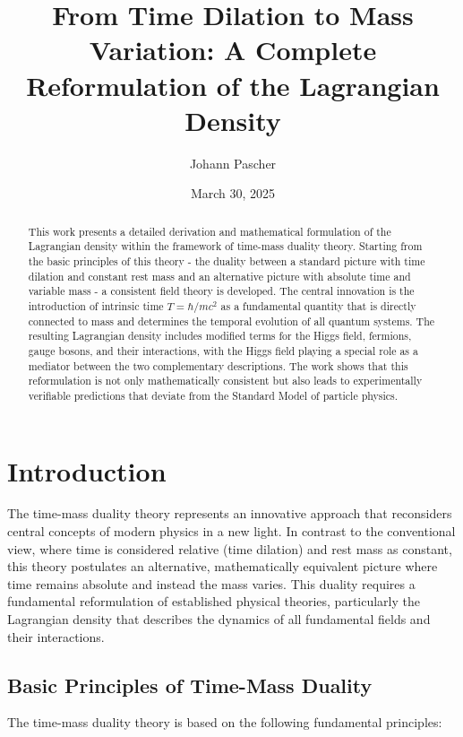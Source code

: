\documentclass{article}
\title{From Time Dilation to Mass Variation: A Complete Reformulation of the Lagrangian Density}
\author{Johann Pascher}
\date{March 30, 2025}
\theoremstyle{definition}
\theoremstyle{remark}
\begin{document}
	
	\maketitle
	
	\begin{abstract}
		This work presents a detailed derivation and mathematical formulation of the Lagrangian density within the framework of time-mass duality theory. Starting from the basic principles of this theory - the duality between a standard picture with time dilation and constant rest mass and an alternative picture with absolute time and variable mass - a consistent field theory is developed. The central innovation is the introduction of intrinsic time $T = \hbar/mc^2$ as a fundamental quantity that is directly connected to mass and determines the temporal evolution of all quantum systems. The resulting Lagrangian density includes modified terms for the Higgs field, fermions, gauge bosons, and their interactions, with the Higgs field playing a special role as a mediator between the two complementary descriptions. The work shows that this reformulation is not only mathematically consistent but also leads to experimentally verifiable predictions that deviate from the Standard Model of particle physics.
	\end{abstract}
	
	\tableofcontents
	\newpage
	
	\section{Introduction}
	
	The time-mass duality theory represents an innovative approach that reconsiders central concepts of modern physics in a new light. In contrast to the conventional view, where time is considered relative (time dilation) and rest mass as constant, this theory postulates an alternative, mathematically equivalent picture where time remains absolute and instead the mass varies. This duality requires a fundamental reformulation of established physical theories, particularly the Lagrangian density that describes the dynamics of all fundamental fields and their interactions.
	
	\subsection{Basic Principles of Time-Mass Duality}
	
	The time-mass duality theory is based on the following fundamental principles:
	
\end{document}
